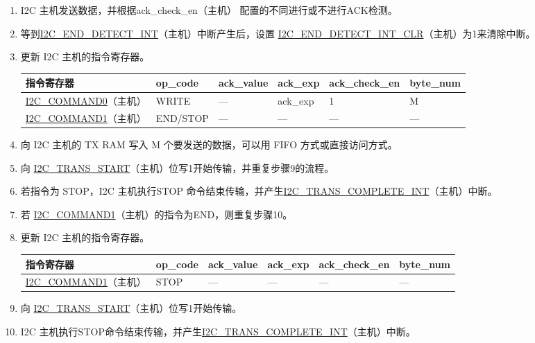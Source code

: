 \documentclass[main\_\_CN.tex]{subfiles}
\begin{document}
\begin{enumerate}
\item I2C 主机发送数据，并根据ack\_check\_en（主机） 配置的不同进行或不进行ACK检测。

\item 等到\hyperref[int:i2c-end]{I2C\_END\_DETECT\_INT}（主机）中断产生后，设置 \hyperref[fielddesc:I2CENDDETECTINTCLR]{I2C\_END\_DETECT\_INT\_CLR}（主机）为1来清除中断。
\item 更新 I2C 主机的指令寄存器。
\begin{longtable}{ | p{4cm} | p{2cm} | p{2cm} | p{2cm} |p{2.2cm} | p{1.8cm} |}
\hline\rowcolor{lightgray}
指令寄存器& op\_code & ack\_value&ack\_exp&ack\_check\_en&byte\_num  \\ \hline
\hyperref[fielddesc:I2CCOMMAND0]{I2C\_COMMAND0}（主机）& WRITE& ---&ack\_exp&1&M  \\ \hline
\hyperref[fielddesc:I2CCOMMAND1]{I2C\_COMMAND1}（主机）& END/STOP& ---&---&---&---  \\ \hline
\end{longtable} 
\vspace{0.5em}
\item 向 I2C 主机的 TX RAM 写入 M 个要发送的数据，可以用 FIFO 方式或直接访问方式。
\item 向 \hyperref[fielddesc:I2CTRANSSTART]{I2C\_TRANS\_START}（主机）位写1开始传输，并重复步骤9的流程。
\item 若指令为 STOP，I2C 主机执行STOP 命令结束传输，并产生\hyperref[int:i2c-trans-complete]{I2C\_TRANS\_COMPLETE\_INT}（主机）中断。
\item 若 \hyperref[fielddesc:I2CCOMMAND1]{I2C\_COMMAND1}（主机）的指令为END，则重复步骤10。
\item 更新 I2C 主机的指令寄存器。
\begin{longtable}{ | p{4cm} | p{2cm} | p{2cm} | p{2cm} |p{2.2cm} | p{1.8cm} |}
\hline\rowcolor{lightgray}
指令寄存器& op\_code & ack\_value&ack\_exp&ack\_check\_en&byte\_num  \\ \hline
\hyperref[fielddesc:I2CCOMMAND1]{I2C\_COMMAND1}（主机）& STOP& ---&---&---&---  \\ \hline
\end{longtable} 
\item 向 \hyperref[fielddesc:I2CTRANSSTART]{I2C\_TRANS\_START}（主机）位写1开始传输。
\item I2C 主机执行STOP命令结束传输，并产生\hyperref[int:i2c-trans-complete]{I2C\_TRANS\_COMPLETE\_INT}（主机）中断。

\end{enumerate}
\end{document}
